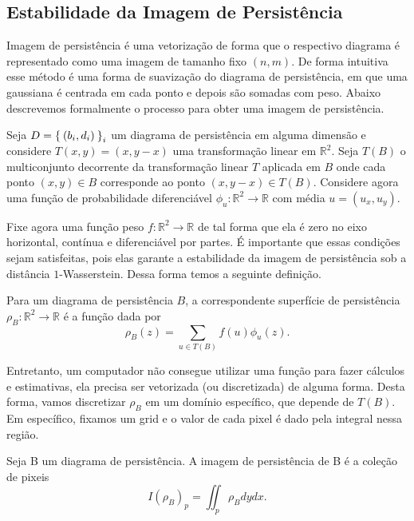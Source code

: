\subsection{Estabilidade da Imagem de Persistência}
Imagem de persistência é uma vetorização de forma que o respectivo diagrama é representado como 
uma imagem de tamanho fixo $(n,m)$. De forma intuitiva esse método é uma forma de suavização do diagrama 
de persistência, em que uma gaussiana é centrada em cada ponto e depois são somadas com peso. Abaixo descrevemos
formalmente o processo para obter uma imagem de persistência.

Seja $D = \Set{(b_i,d_i)}_{i}$ um diagrama de persistência em alguma dimensão e considere $T(x,y) = (x, y-x)$ 
uma transformação linear em $\mathbb{R}^2$. Seja $T(B)$ o multiconjunto decorrente da transformação linear $T$
aplicada em $B$ onde cada ponto $(x,y) \in B$ corresponde ao ponto $(x,y-x) \in T(B)$. Considere agora uma 
função de probabilidade diferenciável $\phi_u\colon \mathbb{R}^2 \to \mathbb{R}$ com média $u=(u_x, u_y)$. 

Fixe agora uma função peso $f\colon \mathbb{R}^2 \to \mathbb{R}$ de tal forma que ela é zero no eixo horizontal,
contínua e diferenciável por partes. É importante que essas condições sejam satisfeitas, pois elas garante
a estabilidade da imagem de persistência sob a distância $1$-Wasserstein. Dessa forma temos a seguinte definição. 

\begin{defi}
    Para um diagrama de persistência $B$, a correspondente superfície de persistência $\rho_B \colon \mathbb{R}^2
    \to \mathbb{R}$ é a função dada por 
    \begin{equation*}
        \rho_B(z) = \sum_{u \in T(B)} f(u) \phi_u(z). 
    \end{equation*}
\end{defi}

Entretanto, um computador não consegue utilizar uma função para fazer cálculos e estimativas, ela precisa
ser vetorizada (ou discretizada) de alguma forma. Desta forma, vamos discretizar $\rho_B$ em um domínio específico,
que depende de $T(B)$. Em específico, fixamos um grid e o valor de cada pixel é dado pela integral nessa região.

\begin{defi}
    Seja B um diagrama de persistência. A imagem de persistência de B é a coleção de pixeis 
    \begin{equation*}
        I(\rho_B)_p = \iint_p \rho_B dydx.
    \end{equation*}
\end{defi}

